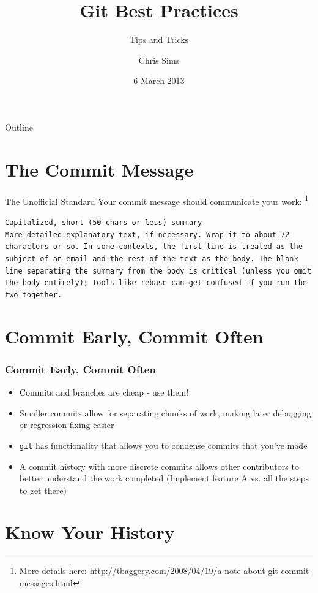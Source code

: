 \documentclass{beamer}
\title{Git Best Practices}
\subtitle{Tips and Tricks}
\author{Chris Sims}
\institute{Engineering and Computer Science Interest Group \\
           URI Student ACM Chapter}
\date{6 March 2013}
\begin{document}
\frame{\titlepage}

\begin{frame}{Outline}
  \tableofcontents
\end{frame}


\section{The Commit Message}
\begin{frame}{The Unofficial Standard}
  Your commit message should communicate your work:
  \footnote{More details here:
  \href{http://tbaggery.com/2008/04/19/a-note-about-git-commit-messages.html}
  {http://tbaggery.com/2008/04/19/a-note-about-git-commit-messages.html}}

  \texttt{Capitalized, short (50 chars or less) summary}\\
  \vfill
  \texttt{More detailed explanatory text, if necessary.  Wrap it to about 72
    characters or so.  In some contexts, the first line is treated as the
    subject of an email and the rest of the text as the body.  The blank
    line separating the summary from the body is critical (unless you omit
    the body entirely); tools like rebase can get confused if you run the
    two together.
  }

\end{frame}


\section{Commit Early, Commit Often}
\begin{frame}\frametitle{Commit Early, Commit Often}
\begin{itemize}
  \item Commits and branches are cheap - use them!
  \item Smaller commits allow for separating chunks of work, making later
        debugging or regression fixing easier
  \item \texttt{git} has functionality that allows you to condense commits that
        you've made
  \item A commit history with more discrete commits allows other contributors to
        better understand the work completed (Implement feature A vs. all the
        steps to get there)
\end{itemize}

\end{frame}


\section{Know Your History}
\end{document}
